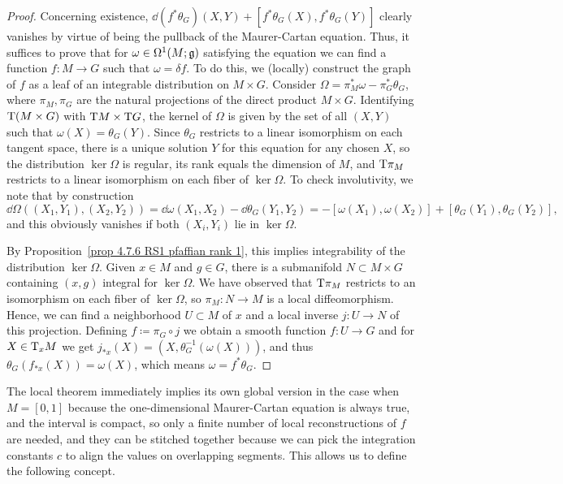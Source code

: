 \begin{proof}
    Concerning existence, $\dd(f^\ast\theta_G)(X,Y)+[f^\ast\theta_G(X),f^\ast\theta_G(Y)]$ clearly vanishes by virtue of being the pullback of the Maurer-Cartan equation. Thus, it suffices to prove that for $\omega\in\Omega^1(M;\mathfrak{g})$ satisfying the equation we can find a function $f:M\to G$ such that $\omega=\delta f$. To do this, we (locally) construct the graph of $f$ as a leaf of an integrable distribution on $M\times G$. Consider $\Omega=\pi^\ast_M\omega-\pi^\ast_G \theta_G$, where $\pi_M,\pi_G$ are the natural projections of the direct product $M\times G$. Identifying $\mathrm{T}(M\times G)$ with $\mathrm{T} M\times \mathrm{T} G$, the kernel of $\Omega$ is given by the set of all $(X,Y)$ such that $\omega(X)=\theta_G(Y)$. Since $\theta_G$ restricts to a linear isomorphism on each tangent space, there is a unique solution $Y$ for this equation for any chosen $X$, so the distribution $\ker\Omega$ is regular, its rank equals the dimension of $M$, and $\mathrm{T}\pi_M$ restricts to a linear isomorphism on each fiber of $\ker \Omega$. To check involutivity, we note that by construction
    \[\dd\Omega\left((X_1,Y_1),(X_2,Y_2)\right)=\dd\omega(X_1,X_2)-\dd \theta_G(Y_1,Y_2)=-[\omega(X_1),\omega(X_2)]+[\theta_G(Y_1),\theta_G(Y_2)],\]
    and this obviously vanishes if both $(X_i,Y_i)$ lie in $\ker\Omega$.

    By Proposition~\ref{prop 4.7.6 RS1 pfaffian rank 1}, this implies integrability of the distribution $\ker\Omega$. Given $x\in M$ and $g\in G$, there is a submanifold $N\subset M\times G$ containing $(x,g)$ integral for $\ker\Omega$. We have observed that $\mathrm{T}\pi_M$ restricts to an isomorphism on each fiber of $\ker \Omega$, so $\pi_M:N\to M$ is a local diffeomorphism. Hence, we can find a neighborhood $U\subset M$ of $x$ and a local inverse $j:U\to N$ of this projection. Defining $f\coloneqq \pi_G\circ j$ we obtain a smooth function $f:U\to G$ and for $X\in \mathrm{T}_xM$ we get $j_{\ast x}(X)=(X,\theta_G^{-1}(\omega(X)))$, and thus $\theta_G(f_{\ast x}(X))=\omega(X)$, which means $\omega=f^\ast\theta_G$.
\end{proof}


The local theorem immediately implies its own global version in the case when $M=[0,1]$ because the one-dimensional Maurer-Cartan equation is always true, and the interval is compact, so only a finite number of local reconstructions of $f$ are needed, and they can be stitched together because we can pick the integration constants $c$ to align the values on overlapping segments. This allows us to define the following concept.

